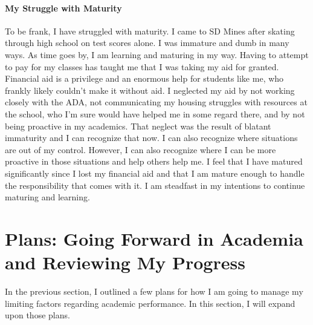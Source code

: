 \documentclass[12pt]{article}
\begin{document}

\paragraph{My Struggle with Maturity}
To be frank, I have struggled with maturity.
I came to SD Mines after skating through high school on test scores alone.
I was immature and dumb in many ways.
As time goes by, I am learning and maturing in my way.
Having to attempt to pay for my classes has taught me that I was taking my 
aid for granted.
Financial aid is a privilege and an enormous help for students like me, who frankly
likely couldn't make it without aid.
I neglected my aid by not working closely with the ADA, %
not communicating my housing struggles with resources at the school, who I'm sure would have 
helped me in some regard there, and by not being proactive in my academics.
That neglect was the result of blatant immaturity and I can recognize that now. 
I can also recognize where situations are out of my control. 
However, I can also recognize where I can be more proactive in those situations 
and help others help me.
I feel that I have matured significantly since I lost my financial aid and that 
I am mature enough to handle the responsibility that comes with it.
I am steadfast in my intentions to continue maturing and learning.


\section*{Plans: Going Forward in Academia and Reviewing My Progress}
In the previous section, I outlined a few plans for how I am going to manage my
limiting factors regarding academic performance.
In this section, I will expand upon those plans.
\end{document}

